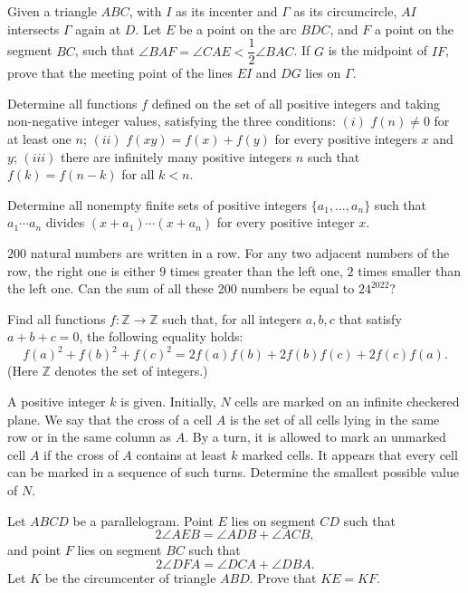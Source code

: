 \documentclass[11pt]{scrartcl}
\begin{document}
\begin{problem}[6098711912608423295]
Given a triangle $ABC$, with $I$ as its incenter and $\Gamma$ as its circumcircle, $AI$ intersects $\Gamma$ again at $D$. Let $E$ be a point on the arc $BDC$, and $F$ a point on the segment $BC$, such that $\angle BAF=\angle CAE < \dfrac12\angle BAC$. If $G$ is the midpoint of $IF$, prove that the meeting point of the lines $EI$ and $DG$ lies on $\Gamma$.
\end{problem}
\begin{problem}[6116877365036470315]
	Determine all functions $f$ defined on the set of all positive integers and taking non-negative integer values, satisfying the three conditions:
$(i)$ $f(n) \neq 0$ for at least one $n$;
$(ii)$ $f(x y)=f(x)+f(y)$ for every positive integers $x$ and $y$;
$(iii)$ there are infinitely many positive integers $n$ such that $f(k)=f(n-k)$ for all $k<n$.
\end{problem}
\begin{problem}[6122338123883323140]
	Determine all nonempty finite sets of positive integers $\{a_1, \dots, a_n\}$ such that $a_1 \cdots a_n$ divides $(x + a_1) \cdots (x + a_n)$ for every positive integer $x$.
\end{problem}
\begin{problem}[6135851041251773220]
$200$ natural numbers are written in a row. For any two adjacent numbers of the row, the right one is either $9$ times greater than the left one, $2$ times smaller than the left one. Can the sum of all these 200 numbers be equal to $24^{2022}$?
\end{problem}
\begin{problem}[6174780824971319633]
Find all functions $f:\mathbb Z\rightarrow \mathbb Z$ such that, for all integers $a,b,c$ that satisfy $a+b+c=0$, the following equality holds:
\[f(a)^2+f(b)^2+f(c)^2=2f(a)f(b)+2f(b)f(c)+2f(c)f(a).\]
(Here $\mathbb{Z}$ denotes the set of integers.)
\end{problem}
\begin{problem}[6183425212304704085]
	A positive integer $k$ is given. Initially, $N$ cells are marked on an infinite checkered plane. We say that the cross of a cell $A$ is the set of all cells lying in the same row or in the same column as $A$. By a turn, it is allowed to mark an unmarked cell $A$ if the cross of $A$ contains at least $k$ marked cells. It appears that every cell can be marked in a sequence of such turns. Determine the smallest possible value of $N$.
\end{problem}
\begin{problem}[6190379360381554657]
	Let $ABCD$ be a parallelogram. Point $E$ lies on segment $CD$ such that\[2\angle AEB=\angle ADB+\angle ACB,\]and point $F$ lies on segment $BC$ such that\[2\angle DFA=\angle DCA+\angle DBA.\]Let $K$ be the circumcenter of triangle $ABD$. Prove that $KE=KF$.
\end{problem}
\end{document}
